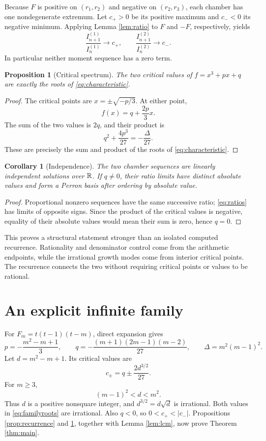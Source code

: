\documentclass[11pt,a4paper]{article}
\newtheorem{proposition}[theorem]{Proposition}
\newtheorem{corollary}[theorem]{Corollary}
\theoremstyle{definition}\newtheorem{definition}[theorem]{Definition}
\theoremstyle{remark}\newtheorem{remark}[theorem]{Remark}
\begin{document}
Because $F$ is positive on $(r_1,r_2)$ and negative on $(r_2,r_3)$, each chamber has one nondegenerate extremum. Let $c_+>0$ be its positive maximum and $c_-<0$ its negative minimum. Applying Lemma \ref{lem:ratio} to $F$ and $-F$, respectively, yields
\begin{equation}\label{eq:ratios}
 \frac{I_{n+1}^{(1)}}{I_n^{(1)}}\longrightarrow c_+,
 \qquad
 \frac{I_{n+1}^{(2)}}{I_n^{(2)}}\longrightarrow c_-.
\end{equation}
In particular neither moment sequence has a zero term.

\begin{proposition}[Critical spectrum]\label{prop:critical}
The two critical values of $f=x^3+px+q$ are exactly the roots of \eqref{eq:characteristic}.
\end{proposition}
\begin{proof}
The critical points are $x=\pm\sqrt{-p/3}$. At either point,
\[
 f(x)=q+\frac{2p}{3}x.
\]
The sum of the two values is $2q$, and their product is
\[
 q^2+\frac{4p^3}{27}=-\frac{\Delta}{27}.
\]
These are precisely the sum and product of the roots of \eqref{eq:characteristic}.
\end{proof}

\begin{corollary}[Independence]
The two chamber sequences are linearly independent solutions over $\mathbb R$. If $q\ne0$, their ratio limits have distinct absolute values and form a Perron basis after ordering by absolute value.
\end{corollary}
\begin{proof}
Proportional nonzero sequences have the same successive ratio; \eqref{eq:ratios} has limits of opposite signs. Since the product of the critical values is negative, equality of their absolute values would mean their sum is zero, hence $q=0$.
\end{proof}

This proves a structural statement stronger than an isolated computed recurrence. Rationality and denominator control come from the arithmetic endpoints, while the irrational growth modes come from interior critical points. The recurrence connects the two without requiring critical points or values to be rational.

\section{An explicit infinite family}\label{sec:family}
For $F_m=t(t-1)(t-m)$, direct expansion gives
\begin{equation}\label{eq:params}
 p=-\frac{m^2-m+1}{3},\qquad
 q=-\frac{(m+1)(2m-1)(m-2)}{27},\qquad
 \Delta=m^2(m-1)^2.
\end{equation}
Let $d=m^2-m+1$. Its critical values are
\begin{equation}\label{eq:familyroots}
 c_\pm=q\pm\frac{2d^{3/2}}{27}.
\end{equation}
For $m\ge3$,
\[
 (m-1)^2<d<m^2.
\]
Thus $d$ is a positive nonsquare integer, and $d^{3/2}=d\sqrt d$ is irrational. Both values in \eqref{eq:familyroots} are irrational. Also $q<0$, so $0<c_+<|c_-|$. Propositions \ref{prop:recurrence} and \ref{prop:critical}, together with Lemma \ref{lem:lcm}, now prove Theorem \ref{thm:main}.
\end{document}
